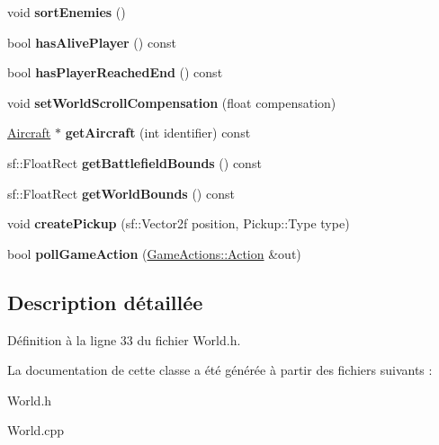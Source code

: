 \begin{DoxyCompactItemize}
\item 
\hypertarget{class_world_a53947f20c6a20a877b7a119d9572f9e8}{}\label{class_world_a53947f20c6a20a877b7a119d9572f9e8} 
void {\bfseries sort\+Enemies} ()
\item 
\hypertarget{class_world_ad27259527b38962bc9faa7a0b38f4b9d}{}\label{class_world_ad27259527b38962bc9faa7a0b38f4b9d} 
bool {\bfseries has\+Alive\+Player} () const
\item 
\hypertarget{class_world_a004d63d76f3c1393f9442cb31af2a300}{}\label{class_world_a004d63d76f3c1393f9442cb31af2a300} 
bool {\bfseries has\+Player\+Reached\+End} () const
\item 
\hypertarget{class_world_a20d5fafa1df7da5bb9278ca33a1c6fdc}{}\label{class_world_a20d5fafa1df7da5bb9278ca33a1c6fdc} 
void {\bfseries set\+World\+Scroll\+Compensation} (float compensation)
\item 
\hypertarget{class_world_a61c420ab669d97df70d7d2b69e3ca19c}{}\label{class_world_a61c420ab669d97df70d7d2b69e3ca19c} 
\hyperlink{class_aircraft}{Aircraft} $\ast$ {\bfseries get\+Aircraft} (int identifier) const
\item 
\hypertarget{class_world_ae5c2531cd68eb3e92d90fd5e9218f0a8}{}\label{class_world_ae5c2531cd68eb3e92d90fd5e9218f0a8} 
sf\+::\+Float\+Rect {\bfseries get\+Battlefield\+Bounds} () const
\item 
\hypertarget{class_world_aebe9adedadddb753cb2037c53548a7bf}{}\label{class_world_aebe9adedadddb753cb2037c53548a7bf} 
sf\+::\+Float\+Rect {\bfseries get\+World\+Bounds} () const
\item 
\hypertarget{class_world_a9854735a8eae90bc092844071a8272cd}{}\label{class_world_a9854735a8eae90bc092844071a8272cd} 
void {\bfseries create\+Pickup} (sf\+::\+Vector2f position, Pickup\+::\+Type type)
\item 
\hypertarget{class_world_a3f51d78daaab42e9ea353f0ab31e51af}{}\label{class_world_a3f51d78daaab42e9ea353f0ab31e51af} 
bool {\bfseries poll\+Game\+Action} (\hyperlink{struct_game_actions_1_1_action}{Game\+Actions\+::\+Action} \&out)
\end{DoxyCompactItemize}


\subsection{Description détaillée}


Définition à la ligne 33 du fichier World.\+h.



La documentation de cette classe a été générée à partir des fichiers suivants \+:\begin{DoxyCompactItemize}
\item 
World.\+h\item 
World.\+cpp\end{DoxyCompactItemize}
